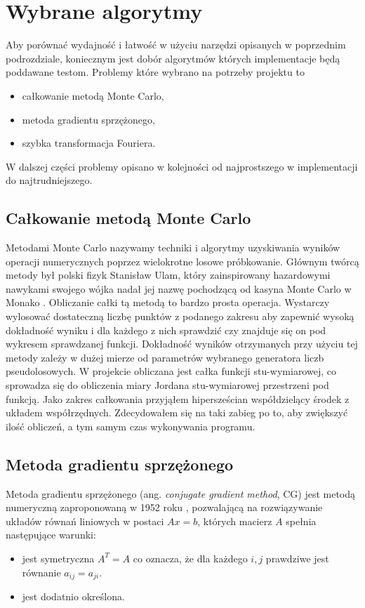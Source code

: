 \documentclass[a4paper,12pt]{book} %
\begin{document}
\section{Wybrane algorytmy}
Aby porównać wydajność i łatwość w użyciu narzędzi opisanych w poprzednim podrozdziale, koniecznym jest dobór algorytmów których implementacje będą poddawane testom. Problemy które wybrano na potrzeby projektu to
\begin{itemize}
\item całkowanie metodą Monte Carlo,
\item metoda gradientu sprzężonego,
\item szybka transformacja Fouriera.
\end{itemize}
W dalszej części problemy opisano w kolejności od najprostszego w implementacji do najtrudniejszego.
\subsection{Całkowanie metodą Monte Carlo}
Metodami Monte Carlo nazywamy techniki i algorytmy uzyskiwania wyników operacji numerycznych poprzez wielokrotne losowe próbkowanie. Głównym twórcą metody był polski fizyk Stanisław Ulam, który zainspirowany hazardowymi nawykami swojego wójka nadał jej nazwę pochodzącą od kasyna Monte Carlo w Monako \cite{mc_beggining}.
Obliczanie całki tą metodą to bardzo prosta operacja. Wystarczy wylosować dostateczną liczbę punktów z podanego zakresu aby zapewnić wysoką dokładność wyniku i dla każdego z nich sprawdzić czy znajduje się on pod wykresem sprawdzanej funkcji. Dokładność wyników otrzymanych przy użyciu tej metody zależy w dużej mierze od parametrów wybranego generatora liczb pseudolosowych.
W projekcie obliczana jest całka funkcji stu-wymiarowej, co sprowadza się do obliczenia miary Jordana\cite{miara-jordana} stu-wymiarowej przestrzeni pod funkcją. Jako zakres całkowania przyjąłem hipersześcian współdzielący środek z układem współrzędnych. Zdecydowałem się na taki zabieg po to, aby zwiększyć ilość obliczeń, a tym samym czas wykonywania programu. 
\subsection{Metoda gradientu sprzężonego}
Metoda gradientu sprzężonego (ang. \emph{conjugate gradient method}, CG) jest metodą numeryczną zaproponowaną w 1952 roku \cite{conjugate-gradient}, pozwalającą na rozwiązywanie układów równań liniowych w postaci $Ax = b$, których macierz $A$ spełnia następujące warunki:
\begin{itemize}
\item jest symetryczna $A^T=A$ co oznacza, że dla każdego $i, j$ prawdziwe jest równanie $a_{ij} = a_{ji}.$
\item jest dodatnio określona.
\end{itemize}
\end{document}
